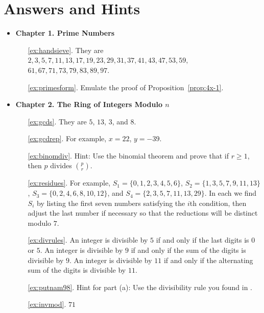 \begin{exercises}
\end{exercises}

\chapter*{Answers and Hints}
\newcommand{\chapitem}[2]{\vspace{2ex}\item {\large \bf #1. #2}}
\begin{itemize}
\chapitem{Chapter 1}{Prime Numbers}
\begin{enumerate}
\item[\ref{ex:handsieve}.] They are
$2, 3, 5, 7, 11, 13, 17, 19, 23, 29, 31, 37, 41, 43, 47, 53, 59,$\\
$61, 67, 71, 73, 79, 83, 89, 97$.
\item[\ref{ex:primesform}.] Emulate the proof of Proposition~\ref{prop:4x-1}.
\end{enumerate}

\chapitem{Chapter 2}{The Ring of Integers Modulo $n$}
\begin{enumerate}
\item[\ref{ex:gcds}.] They are $5$, $13$, $3$, and $8$.
\item[\ref{ex:gcdrep}.] For example, $x=22$, $y=-39$.

\item[\ref{ex:binomdiv}.] Hint: Use the binomial theorem
and prove that if $r\geq 1$, then $p$ divides
$\binom{p}{r}$.

\item[\ref{ex:residues}.] For example,
$S_1 = \{0,1,2,3,4,5,6\}$, $S_2 = \{1,3,5,7,9,11,13\}$,
$S_3 = \{0,2,4,6,8,10,12\}$, and $S_4 = \{2,3,5,7,11,13,29\}.$
In each we find $S_i$ by listing the first seven numbers
satisfying the $i$th condition, then adjust the last number if
necessary so that the reductions will be distinct modulo $7$.
\item[\ref{ex:divrules}.] An integer is divisible by $5$ if
and only if the last digits is $0$ or $5$.  An integer is
divisible by $9$ if and only if the sum of the digits is
divisible by $9$.  An integer is divisible by $11$ if and only
if the alternating sum of the digits is divisible by $11$.
\item[\ref{ex:putnam98}.] Hint for part (a): Use the divisibility rule
you found in .

\item[\ref{ex:invmod}.] $71$


\end{enumerate}
\end{itemize}
